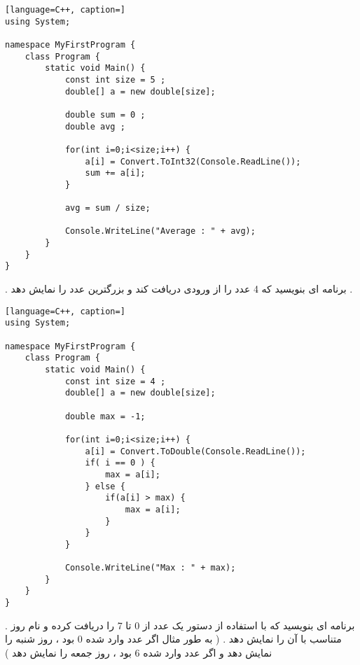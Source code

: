 \documentclass[12pt]{article}
\begin{document}
\begin{latin}
\begin{lstlisting}[language=C++, caption=]
using System;

namespace MyFirstProgram {
	class Program {
		static void Main() {
			const int size = 5 ;
			double[] a = new double[size];
			
			double sum = 0 ;
			double avg ;
			
			for(int i=0;i<size;i++) {
				a[i] = Convert.ToInt32(Console.ReadLine());
				sum += a[i];
			}
			
			avg = sum / size;
	
			Console.WriteLine("Average : " + avg);
		}
	}
}
\end{lstlisting}
\end{latin}







\newpage

 . برنامه ای بنویسید که 4 عدد را از ورودی دریافت کند و بزرگترین عدد را نمایش دهد .





\begin{latin}
\begin{lstlisting}[language=C++, caption=]
using System;

namespace MyFirstProgram {
	class Program {
		static void Main() {
			const int size = 4 ;
			double[] a = new double[size];
			
			double max = -1;
			
			for(int i=0;i<size;i++) {
				a[i] = Convert.ToDouble(Console.ReadLine());
				if( i == 0 ) {
					max = a[i];
				} else {
					if(a[i] > max) {
						max = a[i];
					}
				}
			}
	
			Console.WriteLine("Max : " + max);
		}
	}
}
\end{lstlisting}
\end{latin}





\newpage

 . برنامه ای بنویسید که با استفاده از دستور 
یک عدد از 0 تا 7 را دریافت کرده و نام روز متناسب با آن را نمایش دهد . ( به طور مثال اگر عدد وارد شده 0 بود ، روز شنبه را نمایش دهد و اگر عدد وارد شده 6 بود ، روز جمعه را نمایش دهد  )
\end{document}
